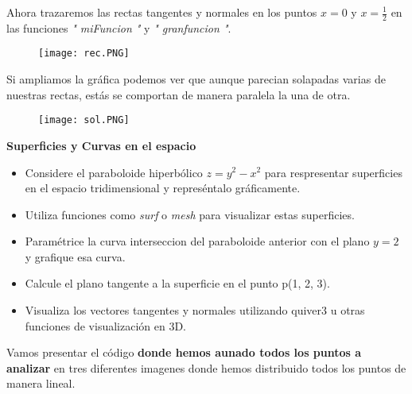 \documentclass[letterpaper]{article}
\begin{document}
\begin{justify}
Ahora  trazaremos las rectas tangentes y normales en los puntos \(x = 0\) y \(x = \frac{1}{2}\) en las funciones \textit{" miFuncion "} y
\textit{" granfuncion "}.
\end{justify}

\vspace{\baselineskip}

\begin{figure}[H]
    \centering
    \texttt{[image: rec.PNG]}        
\end{figure}
\vspace{\baselineskip}

\begin{justify}
    Si ampliamos la gráfica podemos ver que aunque parecian solapadas varias de nuestras rectas, estás se comportan de manera paralela la una de otra.
\end{justify}

\begin{figure}[H]
    \centering
    \texttt{[image: sol.PNG]}        
\end{figure}
\vspace{\baselineskip}

\vspace{\baselineskip}

\begin{justify}
    \textbf{Superficies y Curvas en el espacio}
\end{justify}
\begin{itemize}
    \item Considere el paraboloide hiperbólico \(z = y^2 - x^2\) para respresentar superficies en el espacio tridimensional y represéntalo gráficamente.
    \item Utiliza funciones como \textit{surf} o \textit{mesh} para visualizar estas superficies.
    \item Paramétrice la curva interseccion del paraboloide anterior con el plano
    \(y=2\) y grafique esa curva.
    \item Calcule el plano tangente a la superficie en el punto p(1, 2, 3).
    \item Visualiza los vectores tangentes y normales utilizando quiver3 u otras
    funciones de visualización en 3D. 
\end{itemize}

\vspace{\baselineskip}

\begin{justify}
    Vamos presentar el código \textbf{donde hemos aunado todos los puntos a analizar} en tres diferentes imagenes donde hemos distribuido todos los puntos
    de manera lineal.
\end{justify}
\end{document}
